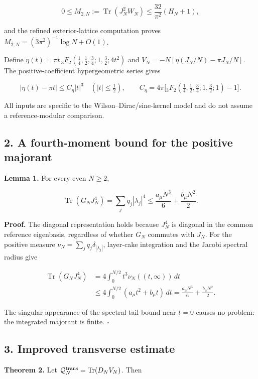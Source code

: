 \documentclass[
  10pt,
  a4paper,
]{article}
\begin{document}
\[
0\le M_{2,N}:=\operatorname{Tr}(J_N^2W_N)
\le\frac{32}{\pi^2}(H_N+1),
\]

and the refined exterior-lattice computation proves \(M_{2,N}=(3\pi^2)^{-1}\log N+O(1)\).

Define \(\eta(t)=\pi t\,{}_3F_2(\frac14,\frac12,\frac34;1,\frac32;4t^2)\) and \(V_N=-N[\eta(J_N/N)-\pi J_N/N]\). The positive-coefficient hypergeometric series gives

\[
\lvert\eta(t)-\pi t\rvert\le C_\eta|t|^3\quad(|t|\le\tfrac12),
\qquad C_\eta=4\pi\bigl[{}_3F_2(\tfrac14,\tfrac12,\tfrac34;1,\tfrac32;1)-1\bigr].
\]

All inputs are specific to the Wilson--Dirac/sine-kernel model and do not assume a reference-modular comparison.

\subsection{2. A fourth-moment bound for the positive majorant}\label{a-fourth-moment-bound-for-the-positive-majorant}

\textbf{Lemma 1.} For every even \(N\ge2\),

\[
\boxed{\operatorname{Tr}(G_NJ_N^4)=\sum_jq_j|\lambda_j|^4
\le\frac{a_\mu N^3}{6}+\frac{b_\mu N^2}{2}.}
\]

\textbf{Proof.} The diagonal representation holds because \(J_N^4\) is diagonal in the common reference eigenbasis, regardless of whether \(G_N\) commutes with \(J_N\). For the positive measure \(\nu_N=\sum_jq_j\delta_{|\lambda_j|}\), layer-cake integration and the Jacobi spectral radius give

\[
\begin{aligned}
\operatorname{Tr}(G_NJ_N^4)
&=4\int_0^{N/2}t^3\nu_N((t,\infty))\,dt\\
&\le4\int_0^{N/2}(a_\mu t^2+b_\mu t)\,dt
=\frac{a_\mu N^3}{6}+\frac{b_\mu N^2}{2}.
\end{aligned}
\]

The singular appearance of the spectral-tail bound near \(t=0\) causes no problem: the integrated majorant is finite. \(\square\)

\subsection{3. Improved transverse estimate}\label{improved-transverse-estimate}

\textbf{Theorem 2.} Let \(\mathcal Q_N^{\rm trans}=\operatorname{Tr}(D_NV_N)\). Then
\end{document}
